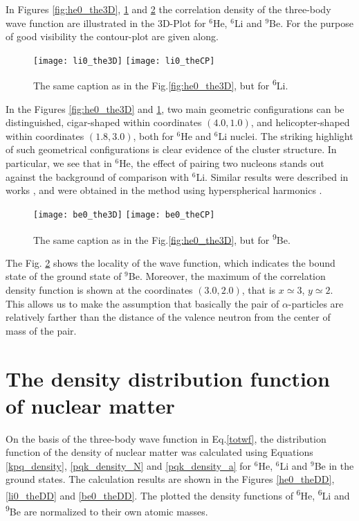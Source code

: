 \documentclass[
12pt, %
oneside, %
english, %
onehalfspacing, %
onehalfspacing, %
headsepline, %
]{MastersDoctoralThesis} %
\newcommand{\he}{\textsuperscript{6}He\xspace}
\newcommand{\li}{\textsuperscript{6}Li\xspace}
\newcommand{\be}{\textsuperscript{9}Be\xspace}
\begin{document}
In Figures \ref{fig:he0_the3D}, \ref{fig:li0_the3D} and \ref{fig:be0_the3D} the correlation density of the three-body wave function are illustrated in the 3D-Plot for $^6$He,  $^6$Li and $^9$Be. For the purpose of good visibility the contour-plot are given along. 

\begin{figure}[tp]
\centering
\texttt{[image: li0\_the3D]}
\texttt{[image: li0\_theCP]}
\decoRule
\caption{ \footnotesize The same caption as in the Fig.\ref{fig:he0_the3D}, but for \li.}
\label{fig:li0_the3D}
\end{figure} 

In the Figures \ref{fig:he0_the3D} and \ref{fig:li0_the3D}, two main geometric configurations can be distinguished, cigar-shaped within coordinates $(4.0, 1.0)$, and helicopter-shaped within coordinates $(1.8, 3.0)$, both for $^6$He and  $^6$Li nuclei. The striking highlight of such geometrical configurations is clear evidence of the cluster structure. In particular, we see that in $^6$He, the effect of pairing two nucleons stands out against the background of comparison with $^6$Li. Similar results were described in works \cite{kukulin1977stochastic}, and were obtained in the method using hyperspherical harmonics \cite{zhukov1993bound}. 

\begin{figure}[bp]
\centering
\texttt{[image: be0\_the3D]}
\texttt{[image: be0\_theCP]}
\decoRule
\caption{ \footnotesize The same caption as in the Fig.\ref{fig:he0_the3D}, but for \be.}
\label{fig:be0_the3D}
\end{figure} 


The Fig. \ref{fig:be0_the3D} shows the locality of the wave function, which indicates the bound state of the ground state of $^9$Be. Moreover, the maximum of the correlation density function is shown at the coordinates $(3.0, 2.0)$, that is $x \simeq 3$, $y \simeq 2$. This allows us to make the assumption that basically the pair of $\alpha$-particles are relatively farther than the distance of the valence neutron from the center of mass of the pair. 

\section{The density distribution function of nuclear matter}
On the basis of the three-body wave function in Eq.\ref{totwf}, the distribution function of the density of nuclear matter was calculated using Equations \ref{kpq_density}, \ref{pqk_density_N} and \ref{pqk_density_a} for $^6$He, $^6$Li and $^9$Be in the ground states. The calculation results are shown in the Figures \ref{he0_theDD}, \ref{li0_theDD} and \ref{be0_theDD}.
The plotted the density functions of \he, \li and \be  are normalized to their own atomic masses. 
\end{document}
